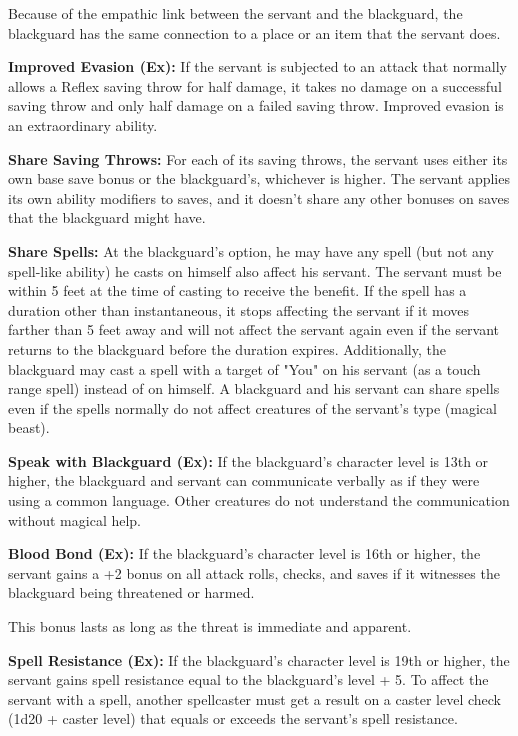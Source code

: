 Because of the empathic link between the servant and the blackguard, the blackguard 
has the same connection to a place or an item that the servant does.

\textbf{Improved Evasion (Ex):} If the servant is subjected to an attack that normally 
allows a Reflex saving throw for half damage, it takes no damage on a successful 
saving throw and only half damage on a failed saving throw. Improved evasion is 
an extraordinary ability.

\textbf{Share Saving Throws:} For each of its saving throws, the servant uses either 
its own base save bonus or the blackguard's, whichever is higher. The servant applies 
its own ability modifiers to saves, and it doesn't share any other bonuses on saves 
that the blackguard might have.

\textbf{Share Spells:} At the blackguard's option, he may have any spell (but not 
any spell-like ability) he casts on himself also affect his servant. The servant 
must be within 5 feet at the time of casting to receive the benefit. If the spell 
has a duration other than instantaneous, it stops affecting the servant if it moves 
farther than 5 feet away and will not affect the servant again even if the servant 
returns to the blackguard before the duration expires. Additionally, the blackguard 
may cast a spell with a target of "You" on his servant (as a touch range spell) 
instead of on himself. A blackguard and his servant can share spells even if the 
spells normally do not affect creatures of the servant's type (magical beast).

\textbf{Speak with Blackguard (Ex):} If the blackguard's character level is 13th 
or higher, the blackguard and servant can communicate verbally as if they were 
using a common language. Other creatures do not understand the communication without 
magical help.

\textbf{Blood Bond (Ex):} If the blackguard's character level is 16th or higher, 
the servant gains a +2 bonus on all attack rolls, checks, and saves if it witnesses 
the blackguard being threatened or harmed.

This bonus lasts as long as the threat is immediate and apparent.

\textbf{Spell Resistance (Ex):} If the blackguard's character level is 19th or 
higher, the servant gains spell resistance equal to the blackguard's level + 5. 
To affect the servant with a spell, another spellcaster must get a result on a 
caster level check (1d20 + caster level) that equals or exceeds the servant's spell 
resistance.
